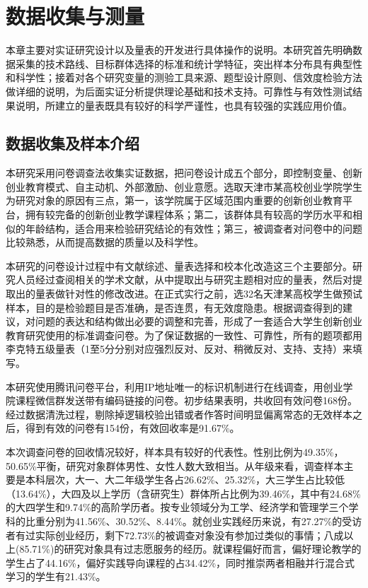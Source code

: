 \chapter{数据收集与测量}

本章主要对实证研究设计以及量表的开发进行具体操作的说明。本研究首先明确数据采集的技术路线、目标群体选择的标准和统计学特征，突出样本分布具有典型性和科学性；接着对各个研究变量的测验工具来源、题型设计原则、信效度检验方法做详细的说明，为后面实证分析提供理论基础和技术支持。可靠性与有效性测试结果说明，所建立的量表既具有较好的科学严谨性，也具有较强的实践应用价值。

\section{数据收集及样本介绍}

本研究采用问卷调查法收集实证数据，把问卷设计成五个部分，即控制变量、创新创业教育模式、自主动机、外部激励、创业意愿。选取天津市某高校创业学院学生为研究对象的原因有三点，第一，该学院属于区域范围内重要的创新创业教育平台，拥有较完备的创新创业教学课程体系；第二，该群体具有较高的学历水平和相似的年龄结构，适合用来检验研究结论的有效性；第三，被调查者对问卷中的问题比较熟悉，从而提高数据的质量以及科学性。

本研究的问卷设计过程中有文献综述、量表选择和校本化改造这三个主要部分。研究人员经过查阅相关的学术文献，从中提取出与研究主题相对应的量表，然后对提取出的量表做针对性的修改改进。在正式实行之前，选32名天津某高校学生做预试样本，目的是检验题目是否准确，是否连贯，有无效度隐患。根据调查得到的建议，对问题的表达和结构做出必要的调整和完善，形成了一套适合大学生创新创业教育研究使用的标准调查问卷。为了保证数据的一致性、可靠性，所有的题项都用李克特五级量表\nolinebreak[3]（1至5分分别对应强烈反对、反对、稍微反对、支持、支持）来填写。

本研究使用腾讯问卷平台，利用IP地址唯一的标识机制进行在线调查，用创业学院课程微信群发送带有编码链接的问卷。初步结果表明，共收回有效问卷168份。经过数据清洗过程，剔除掉逻辑校验出错或者作答时间明显偏离常态的无效样本之后，得到有效的问卷有154份，有效回收率是91.67\%。

本次调查问卷的回收情况较好，样本具有较好的代表性。性别比例为49.35\%，50.65\%平衡，研究对象群体男性、女性人数大致相当。从年级来看，调查样本主要是本科层次，大一、大二年级学生各占26.62\%、25.32\%，大三学生占比较低\nolinebreak[3]（13.64\%），大四及以上学历\nolinebreak[3]（含研究生）群体所占比例为39.46\%，其中有24.68\%的大四学生和9.74\%的高阶学历者。按专业领域分为工学、经济学和管理学三个学科的比重分别为41.56\%、30.52\%、8.44\%。就创业实践经历来说，有27.27\%的受访者有过实际创业经历，剩下72.73\%的被调查对象没有参加过类似的事情；八成以上(85.71\%)的研究对象具有过志愿服务的经历。就课程偏好而言，偏好理论教学的学生占了44.16\%，偏好实践导向课程的占34.42\%，同时推崇两者相融并行混合式学习的学生有21.43\%。

